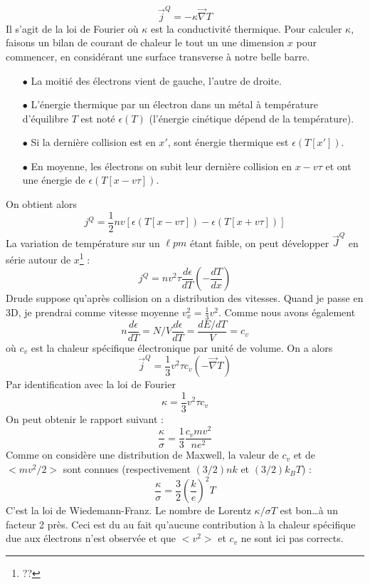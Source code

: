 \begin{equation}
\vec{j}^Q = -\kappa\vec\nabla T
\end{equation}
Il s'agit de la loi de Fourier où $\kappa$ est la conductivité thermique. 
Pour calculer $\kappa$, faisons un bilan de courant de chaleur le tout 
un une dimension $x$ pour commencer, en considérant une surface transverse 
à notre belle barre.
\begin{itemize}
\item[$\bullet$] La moitié des électrons vient de gauche, l'autre de droite.
\item[$\bullet$] L'énergie thermique par un électron dans un métal à 
température d'équilibre $T$ est noté $\epsilon(T)$ (l'énergie cinétique 
dépend de la température).
\item[$\bullet$] Si la dernière collision est en $x'$, sont énergie thermique 
est $\epsilon(T[x'])$.
\item[$\bullet$] En moyenne, les électrons on subit leur dernière collision 
en $x - v\tau$ et ont une énergie de $\epsilon(T[x-v\tau])$.
\end{itemize}
On obtient alors
\begin{equation}
j^Q = \frac{1}{2}nv[\epsilon(T[x-v\tau]) - \epsilon(T[x+v\tau])]
\end{equation}
La variation de température sur un $\ell pm$ étant faible, on peut développer 
$\vec{J}^Q$ en série autour de $x$\footnote{??} :
\begin{equation}
j^Q = nv^2\tau\frac{d\epsilon}{dT}\left(-\dfrac{dT}{dx}\right)
\end{equation}
Drude suppose qu'après collision on a distribution des vitesses. Quand 
je passe en 3D, je prendrai comme vitesse moyenne $v_x^2 = \frac{1}{3}v^2$. 
Comme nous avons également
\begin{equation}
n\frac{d\epsilon}{dT} = N/V\frac{d\epsilon}{dT} = \frac{dE/dT}{V} = c_v
\end{equation} 
où $c_v$ est la chaleur spécifique électronique par unité de volume. On 
a alors
\begin{equation}
\vec{j}^Q = \frac{1}{3}v^2\tau c_v(-\vec{\nabla}T)
\end{equation}
Par identification avec la loi de Fourier 
\begin{equation}
\kappa = \frac{1}{3}v^2 \tau c_v
\end{equation}
On peut obtenir le rapport suivant :
\begin{equation}
\frac{\kappa}{\sigma} = \frac{1}{3}\frac{c_vmv^2}{ne^2}
\end{equation}
Comme on considère une distribution de Maxwell, la valeur de $c_v$ 
et de $<mv^2/2>$ sont connues (respectivement $(3/2)nk$ et $(3/2)k_BT$) :
\begin{equation}
\frac{\kappa}{\sigma} = \frac{3}{2}\left(\frac{k}{e}\right)^2 T
\end{equation}
C'est la loi de Wiedemann-Franz. Le nombre de Lorentz $\kappa/\sigma T$ 
est bon\dots à un facteur 2 près. Ceci est du au fait qu'aucune 
contribution à la chaleur spécifique due aux électrons n'est observée et 
que $<v^2>$ et $c_v$ ne sont ici pas corrects.

